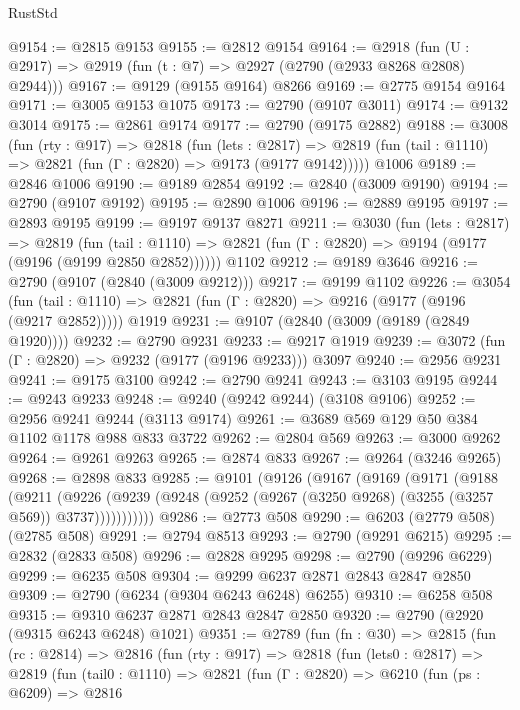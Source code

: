 \begin{lexlean}{RustStd}
\begin{coremodule}
@9154 := @2815 @9153
@9155 := @2812 @9154
@9164 := @2918 (fun (U : @2917) => @2919 (fun (t : @7) => @2927 (@2790 (@2933 @8268 @2808) @2944)))
@9167 := @9129 (@9155 @9164) @8266
@9169 := @2775 @9154 @9164
@9171 := @3005 @9153 @1075
@9173 := @2790 (@9107 @3011)
@9174 := @9132 @3014
@9175 := @2861 @9174
@9177 := @2790 (@9175 @2882)
@9188 := @3008
    (fun (rty : @917) =>
    @2818
      (fun (lets : @2817) =>
      @2819 (fun (tail : @1110) => @2821 (fun (Γ : @2820) => @9173 (@9177 @9142)))))
    @1006
@9189 := @2846 @1006
@9190 := @9189 @2854
@9192 := @2840 (@3009 @9190)
@9194 := @2790 (@9107 @9192)
@9195 := @2890 @1006
@9196 := @2889 @9195
@9197 := @2893 @9195
@9199 := @9197 @9137 @8271
@9211 := @3030
    (fun (lets : @2817) =>
    @2819
      (fun (tail : @1110) => @2821 (fun (Γ : @2820) => @9194 (@9177 (@9196 (@9199 @2850 @2852))))))
    @1102
@9212 := @9189 @3646
@9216 := @2790 (@9107 (@2840 (@3009 @9212)))
@9217 := @9199 @1102
@9226 := @3054
    (fun (tail : @1110) => @2821 (fun (Γ : @2820) => @9216 (@9177 (@9196 (@9217 @2852)))))
    @1919
@9231 := @9107 (@2840 (@3009 (@9189 (@2849 @1920))))
@9232 := @2790 @9231
@9233 := @9217 @1919
@9239 := @3072 (fun (Γ : @2820) => @9232 (@9177 (@9196 @9233))) @3097
@9240 := @2956 @9231
@9241 := @9175 @3100
@9242 := @2790 @9241
@9243 := @3103 @9195
@9244 := @9243 @9233
@9248 := @9240 (@9242 @9244) (@3108 @9106)
@9252 := @2956 @9241 @9244 (@3113 @9174)
@9261 := @3689 @569 @129 @50 @384 @1102 @1178 @988 @833 @3722
@9262 := @2804 @569
@9263 := @3000 @9262
@9264 := @9261 @9263
@9265 := @2874 @833
@9267 := @9264 (@3246 @9265)
@9268 := @2898 @833
@9285 := @9101
    (@9126
      (@9167
        (@9169
          (@9171
            (@9188
              (@9211
                (@9226
                  (@9239 (@9248 (@9252 (@9267 (@3250 @9268) (@3255 (@3257 @569)) @3737)))))))))))
@9286 := @2773 @508
@9290 := @6203 (@2779 @508) (@2785 @508)
@9291 := @2794 @8513
@9293 := @2790 (@9291 @6215)
@9295 := @2832 (@2833 @508)
@9296 := @2828 @9295
@9298 := @2790 (@9296 @6229)
@9299 := @6235 @508
@9304 := @9299 @6237 @2871 @2843 @2847 @2850
@9309 := @2790 (@6234 (@9304 @6243 @6248) @6255)
@9310 := @6258 @508
@9315 := @9310 @6237 @2871 @2843 @2847 @2850
@9320 := @2790 (@2920 (@9315 @6243 @6248) @1021)
@9351 := @2789
    (fun (fn : @30) =>
    @2815
      (fun (rc : @2814) =>
      @2816
        (fun (rty : @917) =>
        @2818
          (fun (lets0 : @2817) =>
          @2819
            (fun (tail0 : @1110) =>
            @2821
              (fun (Γ : @2820) =>
              @6210
                (fun (ps : @6209) =>
                @2816

\end{coremodule}
\end{lexlean}
